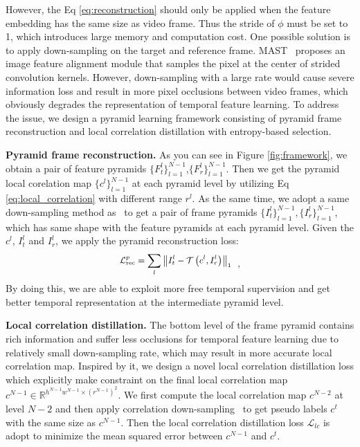 \documentclass{article}
\begin{document}
However, the Eq \ref{eq:reconstruction} should only be applied when the feature embedding has the same size as video frame. Thus the stride of $\phi$ must be set to 1, which introduces large memory and computation cost. One possible solution is to apply down-sampling on the target and reference frame. MAST~\cite{lai2020mast} proposes an image feature alignment module that samples the pixel at the center of strided convolution kernels. However, down-sampling with a large rate would cause severe information loss and result in more pixel occlusions between video frames, which obviously degrades the representation of temporal feature learning. To address the issue, we design a pyramid learning framework consisting of pyramid frame reconstruction and local correlation distillation with entropy-based selection.

\textbf{Pyramid frame reconstruction.}  As you can see in Figure \ref{fig:framework}, we obtain a pair of feature pyramids $\{F^l_t\}^{N-1}_{l=1}$,$\{F^l_{r}\}^{N-1}_{l=1}$.  Then we get the pyramid local corelation map $\{c^l\}^{N-1}_{l=1}$ at each pyramid level by utilizing Eq \ref{eq:local_correlation} with different range $r^l$. As the same time, we adopt a same down-sampling method as~\cite{lai2020mast} to get a pair of frame pyramids $\{I^l_t\}^{N-1}_{l=1},\{I^l_{r}\}^{N-1}_{l=1}$, which has same shape with the feature pyramids at each pyramid level. Given the $c^l$, $I^l_t$ and $I^l_r$, we apply the pyramid reconstruction loss:
\begin{equation}\label{eq:pyramid reconstruction loss}
  \small
  \begin{aligned}
    \mathcal{L}^{p}_{\mathrm{rec}}=\sum_l\left\|I^l_{t}-\mathcal{T}\left(c^l, I^l_r\right)\right\|_{1}
  \end{aligned}~~,
\end{equation}
By doing this, we are able to exploit more free temporal supervision and get better temporal representation at the intermediate pyramid level. 

\textbf{Local correlation distillation.} The bottom level of the frame pyramid contains rich information and suffer less occlusions for temporal feature learning due to relatively small down-sampling rate, which may result in more accurate local correlation map. Inspired by it, we design a novel local correlation distillation loss which explicitly make constraint on the final local correlation map $c^{N-1} \in \mathbb{R}^{h^{N-1}w^{N-1} \times (r^{N-1})^2}$. We first compute the local correlation map $c^{N-2}$ at level $N-2$ and then apply  correlation down-sampling~\cite{teed2020raft} to get pseudo labels $c^t$ with the same size as $c^{N-1}$.  Then the local correlation distillation loss $\mathcal{L}_{lc}$ is adopt to minimize the mean squared error between $c^{N-1}$ and $c^t$.\\
\end{document}
